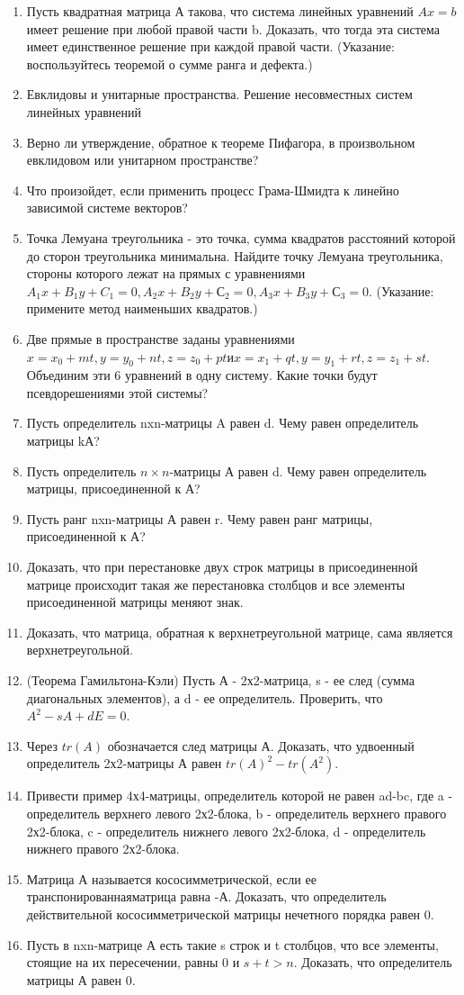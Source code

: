 \documentclass[a4paper]{article}
\begin{document}
\begin{enumerate}
\item Пусть квадратная матрица А такова, что система линейных уравнений $Ax=b$ имеет решение при любой правой части b. Доказать, что тогда эта система имеет единственное решение при каждой правой части. (Указание: воспользуйтесь теоремой о сумме ранга и дефекта.)
\item Евклидовы и унитарные пространства. Решение несовместных систем линейных уравнений
\item Верно ли утверждение, обратное к теореме Пифагора, в произвольном евклидовом или унитарном пространстве?
\item Что произойдет, если применить процесс Грама-Шмидта к линейно зависимой системе векторов?
\item Точка Лемуана треугольника - это точка, сумма квадратов расстояний которой до сторон треугольника минимальна. Найдите точку Лемуана треугольника, стороны которого лежат на прямых с уравнениями $A_1x+B_1y+C_1=0, A_2x+B_2y+С_2=0, A_3x+B_3y+С_3=0$. (Указание: примените метод наименьших квадратов.)
\item Две прямые в пространстве заданы уравнениями $x=x_0+mt, y=y_0+nt, z=z_0+pt и x=x_1+qt, y=y_1+rt, z=z_1+st$. Объединим эти 6 уравнений в одну систему. Какие точки будут псевдорешениями этой системы?
\item Пусть определитель nxn-матрицы A равен d. Чему равен определитель матрицы kА?
\item Пусть определитель $n \times n$-матрицы А равен d. Чему равен определитель матрицы, присоединенной к А?
\item Пусть ранг nxn-матрицы А равен r. Чему равен ранг матрицы, присоединенной к А?
\item Доказать, что при перестановке двух строк матрицы в присоединенной матрице происходит такая же перестановка столбцов и все элементы присоединенной матрицы меняют знак.
\item Доказать, что матрица, обратная к верхнетреугольной матрице, сама является верхнетреугольной.
\item (Теорема Гамильтона-Кэли) Пусть А - 2х2-матрица, s - ее след (сумма диагональных элементов), а d - ее определитель. Проверить, что $A^2-sA+dE=0$.
\item Через $tr(A)$ обозначается след матрицы А. Доказать, что удвоенный определитель 2х2-матрицы А равен $tr(A)^2-tr(A^2)$.
\item Привести пример 4х4-матрицы, определитель которой не равен ad-bc, где a - определитель верхнего левого 2х2-блока, b - определитель верхнего правого 2х2-блока, c - определитель нижнего левого 2х2-блока, d - определитель нижнего правого 2х2-блока.
\item Матрица А называется кососимметрической, если ее транспонированнаяматрица равна -А. Доказать, что определитель действительной кососимметрической матрицы нечетного порядка равен 0.
\item Пусть в nxn-матрице А есть такие s строк и t столбцов, что все элементы, стоящие на их пересечении, равны 0 и $s+t>n$. Доказать, что определитель матрицы А равен 0.
\end{enumerate}
\end{document}
